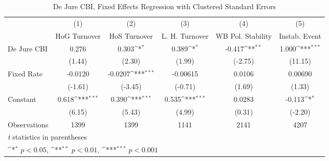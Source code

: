 \begin{table}[htbp]\centering
\def\sym#1{\ifmmode^{#1}\else\(^{#1}\)\fi}
\caption{De Jure CBI, Fixed Effects Regression with Clustered Standard Errors \label{multIndFEDJ}}
\begin{tabular}{l*{5}{c}}
\toprule
                                        &\multicolumn{1}{c}{(1)}&\multicolumn{1}{c}{(2)}&\multicolumn{1}{c}{(3)}&\multicolumn{1}{c}{(4)}&\multicolumn{1}{c}{(5)}\\
                                        &\multicolumn{1}{c}{HoG Turnover}&\multicolumn{1}{c}{HoS Turnover}&\multicolumn{1}{c}{L. H. Turnover}&\multicolumn{1}{c}{WB Pol. Stability}&\multicolumn{1}{c}{Instab. Event}\\
\midrule
De Jure CBI                             &    0.276         &    0.303\sym{*}  &    0.389\sym{*}  &   -0.417\sym{**} &    1.000\sym{***}\\
                                        &   (1.44)         &   (2.30)         &   (1.99)         &  (-2.75)         &  (11.15)         \\
\addlinespace
Fixed Rate                              &  -0.0120         &  -0.0207\sym{***}& -0.00615         &   0.0106         &  0.00690         \\
                                        &  (-1.61)         &  (-3.45)         &  (-0.71)         &   (1.69)         &   (1.33)         \\
\addlinespace
Constant                                &    0.618\sym{***}&    0.390\sym{***}&    0.535\sym{***}&   0.0283         &   -0.113\sym{*}  \\
                                        &   (6.15)         &   (5.43)         &   (4.99)         &   (0.31)         &  (-2.20)         \\
\midrule
Observations                            &     1399         &     1399         &     1141         &     2141         &     4207         \\
\bottomrule
\multicolumn{6}{l}{\footnotesize \textit{t} statistics in parentheses}\\
\multicolumn{6}{l}{\footnotesize \sym{*} \(p<0.05\), \sym{**} \(p<0.01\), \sym{***} \(p<0.001\)}\\
\end{tabular}
\end{table}
